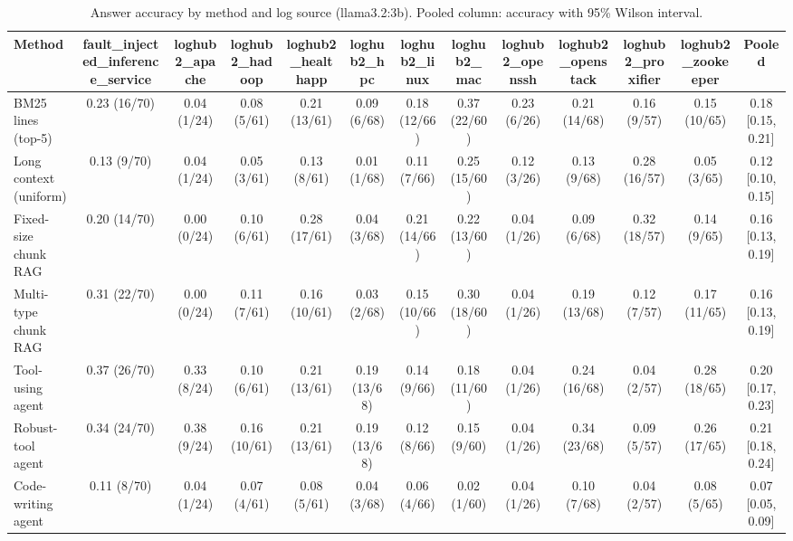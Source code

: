 \begin{table}[t]
\centering
\caption{Answer accuracy by method and log source (llama3.2:3b). Pooled column: accuracy with 95\% Wilson interval.}
\label{tab:main_comparison__llama3_2_3b}
\begin{tabular}{@{}lcccccccccccc@{}}
\toprule
Method & fault\_injected\_inference\_service & loghub2\_apache & loghub2\_hadoop & loghub2\_healthapp & loghub2\_hpc & loghub2\_linux & loghub2\_mac & loghub2\_openssh & loghub2\_openstack & loghub2\_proxifier & loghub2\_zookeeper & Pooled \\
\midrule
BM25 lines (top-5) & 0.23 (16/70) & 0.04 (1/24) & 0.08 (5/61) & 0.21 (13/61) & 0.09 (6/68) & 0.18 (12/66) & 0.37 (22/60) & 0.23 (6/26) & 0.21 (14/68) & 0.16 (9/57) & 0.15 (10/65) & 0.18 [0.15, 0.21] \\
Long context (uniform) & 0.13 (9/70) & 0.04 (1/24) & 0.05 (3/61) & 0.13 (8/61) & 0.01 (1/68) & 0.11 (7/66) & 0.25 (15/60) & 0.12 (3/26) & 0.13 (9/68) & 0.28 (16/57) & 0.05 (3/65) & 0.12 [0.10, 0.15] \\
Fixed-size chunk RAG & 0.20 (14/70) & 0.00 (0/24) & 0.10 (6/61) & 0.28 (17/61) & 0.04 (3/68) & 0.21 (14/66) & 0.22 (13/60) & 0.04 (1/26) & 0.09 (6/68) & 0.32 (18/57) & 0.14 (9/65) & 0.16 [0.13, 0.19] \\
Multi-type chunk RAG & 0.31 (22/70) & 0.00 (0/24) & 0.11 (7/61) & 0.16 (10/61) & 0.03 (2/68) & 0.15 (10/66) & 0.30 (18/60) & 0.04 (1/26) & 0.19 (13/68) & 0.12 (7/57) & 0.17 (11/65) & 0.16 [0.13, 0.19] \\
Tool-using agent & 0.37 (26/70) & 0.33 (8/24) & 0.10 (6/61) & 0.21 (13/61) & 0.19 (13/68) & 0.14 (9/66) & 0.18 (11/60) & 0.04 (1/26) & 0.24 (16/68) & 0.04 (2/57) & 0.28 (18/65) & 0.20 [0.17, 0.23] \\
Robust-tool agent & 0.34 (24/70) & 0.38 (9/24) & 0.16 (10/61) & 0.21 (13/61) & 0.19 (13/68) & 0.12 (8/66) & 0.15 (9/60) & 0.04 (1/26) & 0.34 (23/68) & 0.09 (5/57) & 0.26 (17/65) & 0.21 [0.18, 0.24] \\
Code-writing agent & 0.11 (8/70) & 0.04 (1/24) & 0.07 (4/61) & 0.08 (5/61) & 0.04 (3/68) & 0.06 (4/66) & 0.02 (1/60) & 0.04 (1/26) & 0.10 (7/68) & 0.04 (2/57) & 0.08 (5/65) & 0.07 [0.05, 0.09] \\
\bottomrule
\end{tabular}
\end{table}

